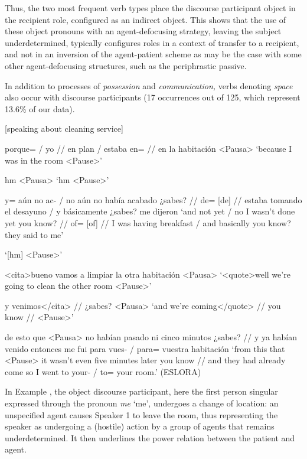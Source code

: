 \documentclass[output=paper]{langscibook}
\begin{document}
Thus, the two most frequent verb types place the discourse participant object in the recipient role, configured as an indirect object. This shows that the use of these object pronouns with an agent-defocusing strategy, leaving the subject underdetermined, typically configures roles in a context of transfer to a recipient, and not in an inversion of the agent-patient scheme as may be the case with some other agent-defocusing structures, such as the periphrastic passive.  


In addition to processes of \textit{possession} and \textit{communication,} verbs denoting \textit{space} also occur with discourse participants (17 occurrences out of 125, which represent 13.6\% of our data).  

\ea\label{ex:pierre:13}{[speaking about cleaning service]}
\begin{xlist}[Speaker 2]
 porque= / yo // en plan / estaba en= // en la habitación <Pausa>
 ‘because I was in the room <Pause>’

 hm <Pausa>
 ‘hm <Pause>’

 y= aún no ac- / no aún no había acabado ¿sabes? // de= [de] // estaba tomando el desayuno / y  {básicamente ¿sabes? me dijeron} 
 ‘and not yet / no I wasn't done yet you know? // of= [of] // I was having breakfast / and  basically    you know? they said to me’ 

 ‘[hm] <Pause>’

 <cita>bueno vamos a limpiar la otra habitación <Pausa>
 ‘<quote>well we're going to clean the other room <Pause>’ 

 y venimos</cita> // ¿sabes? <Pausa>
 ‘and we're coming</quote> // you know // <Pause>’ 

 de esto que <Pausa> no habían pasado ni cinco minutos ¿sabes? // y ya habían venido entonces me fui para vues- / para= vuestra habitación 
 ‘from this that <Pause> it wasn't even five minutes later you know // and they had already come so I went to your- / to= your room.’  (ESLORA)
\end{xlist}
\z 

In Example , the object discourse participant, here the first person singular expressed through the pronoun \textit{me} ‘me’, undergoes a change of location: an unspecified agent causes Speaker 1 to leave the room, thus representing the speaker as undergoing a (hostile) action by a group of agents that remains underdetermined. It then underlines the power relation between the patient and agent.  
\end{document}
